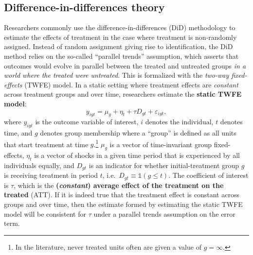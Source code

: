 \hypertarget{difference-in-differences-theory}{%
\subsection{Difference-in-differences
theory}\label{difference-in-differences-theory}}

Researchers commonly use the difference-in-differences (DiD) methodology
to estimate the effects of treatment in the case where treatment is
non-randomly assigned. Instead of random assignment giving rise to
identification, the DiD method relies on the so-called ``parallel
trends'' assumption, which asserts that outcomes would evolve in
parallel between the treated and untreated groups \emph{in a world where
the treated were untreated}. This is formalized with the \emph{two-way
fixed-effects} (TWFE) model. In a static setting where treatment effects
are \emph{constant} across treatment groups and over time, researchers
estimate the \textbf{static TWFE model}: \begin{equation}\label{eq:twfe}
  y_{igt} = \mu_g + \eta_t + \tau D_{gt} + \varepsilon_{igt},
\end{equation} where \(y_{igt}\) is the outcome variable of interest,
\(i\) denotes the individual, \(t\) denotes time, and \(g\) denotes
group membership where a ``group'' is defined as all units that start
treatment at time \(g\).\footnote{In the literature, never treated units
  often are given a value of \(g = \infty\).} \(\mu_g\) is a vector of
time-invariant group fixed-effects, \(\eta_t\) is a vector of shocks in
a given time period that is experienced by all individuals equally, and
\(D_{gt}\) is an indicator for whether initial-treatment group \(g\) is
receiving treatment in period \(t\),
i.e.~\(D_{gt} \equiv \mathbb{1}(g \leq t)\). The coefficient of interest
is \(\tau\), which is the \textbf{(\emph{constant}) average effect of
the treatment on the treated} (ATT). If it is indeed true that the
treatment effect is constant across groups and over time, then the
estimate formed by estimating the static TWFE model will be consistent
for \(\tau\) under a parallel trends assumption on the error term.

